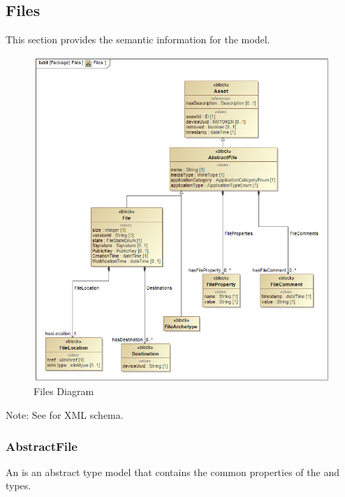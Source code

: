 \subsection{Files} \label{sec:Files}


This section provides the semantic information for the  model.

\begin{figure}[ht]
  \centering
    \includegraphics[width=1.0\textwidth]{figures/Files.png}
  \caption{Files Diagram}
  \label{fig:Files Diagram}
\end{figure}

\FloatBarrier


Note: See  for XML schema.



\subsubsection{AbstractFile}
\label{sec:AbstractFile}



An  is an abstract  type model that contains the common properties of the  and  types.


